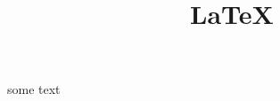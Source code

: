 \documentclass[fontsize=11pt, paper=a4]{report}
\begin{document}
\title{\LaTeX}
\maketitle
some text
\end{document}
